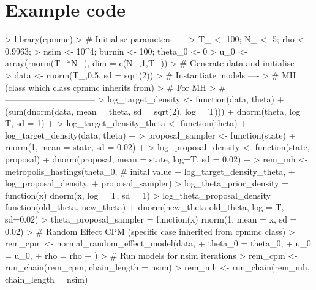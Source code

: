 \documentclass{article}
\begin{document}
\section{Example code}
\begin{Schunk}
\begin{Sinput}
> library(cpmmc)
> # Initialise parameters ----
> T_ <- 100; N_ <- 5; rho <- 0.9963;
> nsim <- 10^4; burnin <- 100; theta_0 <- 0
> u_0 <- array(rnorm(T_*N_), dim = c(N_,1,T_))
> # Generate data and initialise ----
> data <- rnorm(T_,0.5, sd = sqrt(2))
> # Instantiate models ----
> # MH (class which class cpmmc inherits from)
> # For MH
> # --------------------------------
> log_target_density <- function(data, theta){
+   (sum(dnorm(data, mean = theta, sd = sqrt(2), log = T))) + dnorm(theta, log = T, sd = 1)
+ }
> log_target_density_theta <- function(theta){
+   log_target_density(data, theta)
+ }
> proposal_sampler <- function(state){
+   rnorm(1, mean = state, sd = 0.02)
+ }
> log_proposal_density <- function(state, proposal){
+   dnorm(proposal, mean = state, log=T, sd = 0.02)
+ }
> rem_mh <- metropolis_hastings(theta_0, # inital value
+                           log_target_density_theta,
+                           log_proposal_density,
+                           proposal_sampler)
> log_theta_prior_density = function(x) dnorm(x, log = T, sd = 1)
> log_theta_proposal_density = function(old_theta, new_theta)
+                               dnorm(new_theta-old_theta, log = T, sd=0.02)
> theta_proposal_sampler = function(x) rnorm(1, mean = x, sd = 0.02)
> # Random Effect CPM (specific case inherited from cpmmc class)
> rem_cpm <- normal_random_effect_model(data,
+             theta_0 = theta_0,
+             u_0 = u_0,
+             rho = rho
+ )
> # Run models for nsim iterations
> rem_cpm <- run_chain(rem_cpm, chain_length = nsim)
> rem_mh <- run_chain(rem_mh, chain_length = nsim)
\end{Sinput}
\end{Schunk}


  
\end{document}

